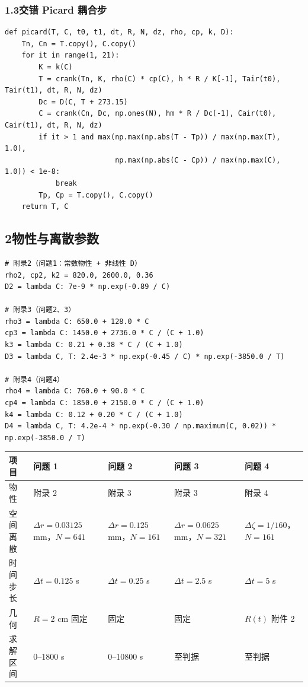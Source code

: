 \documentclass[12pt,a4paper]{ctexart}
\begin{document}
\subsubsection*{1.3\quad 交错 Picard 耦合步}

\begin{lstlisting}
def picard(T, C, t0, t1, dt, R, N, dz, rho, cp, k, D):
    Tn, Cn = T.copy(), C.copy()
    for it in range(1, 21):
        K = k(C)
        T = crank(Tn, K, rho(C) * cp(C), h * R / K[-1], Tair(t0), Tair(t1), dt, R, N, dz)
        Dc = D(C, T + 273.15)
        C = crank(Cn, Dc, np.ones(N), hm * R / Dc[-1], Cair(t0), Cair(t1), dt, R, N, dz)
        if it > 1 and max(np.max(np.abs(T - Tp)) / max(np.max(T), 1.0),
                          np.max(np.abs(C - Cp)) / max(np.max(C), 1.0)) < 1e-8:
            break
        Tp, Cp = T.copy(), C.copy()
    return T, C
\end{lstlisting}

\subsection*{2\quad 物性与离散参数}

\begin{lstlisting}
# 附录2（问题1：常数物性 + 非线性 D）
rho2, cp2, k2 = 820.0, 2600.0, 0.36
D2 = lambda C: 7e-9 * np.exp(-0.89 / C)

# 附录3（问题2、3）
rho3 = lambda C: 650.0 + 128.0 * C
cp3 = lambda C: 1450.0 + 2736.0 * C / (C + 1.0)
k3 = lambda C: 0.21 + 0.38 * C / (C + 1.0)
D3 = lambda C, T: 2.4e-3 * np.exp(-0.45 / C) * np.exp(-3850.0 / T)

# 附录4（问题4）
rho4 = lambda C: 760.0 + 90.0 * C
cp4 = lambda C: 1850.0 + 2150.0 * C / (C + 1.0)
k4 = lambda C: 0.12 + 0.20 * C / (C + 1.0)
D4 = lambda C, T: 4.2e-4 * np.exp(-0.30 / np.maximum(C, 0.02)) * np.exp(-3850.0 / T)
\end{lstlisting}

\begin{table}[htbp]
\centering
{}
\setlength{\tabcolsep}{4pt}
\renewcommand{\arraystretch}{1.25}
\begin{tabular}{@{}lllll@{}}
\toprule
项目 & 问题 1 & 问题 2 & 问题 3 & 问题 4 \\
\midrule
物性 & 附录 2 & 附录 3 & 附录 3 & 附录 4 \\
空间离散 & $\Delta r=0.03125$ mm，$N=641$ & $\Delta r=0.125$ mm，$N=161$
         & $\Delta r=0.0625$ mm，$N=321$ & $\Delta\zeta=1/160$，$N=161$ \\
时间步长 & $\Delta t=0.125$ s & $\Delta t=0.25$ s & $\Delta t=2.5$ s & $\Delta t=5$ s \\
几何 & $R=2$ cm 固定 & 固定 & 固定 & $R(t)$ 附件 2 \\
求解区间 & 0--1800 s & 0--10800 s & 至判据 & 至判据 \\
\bottomrule
\end{tabular}
\end{table}
\end{document}
